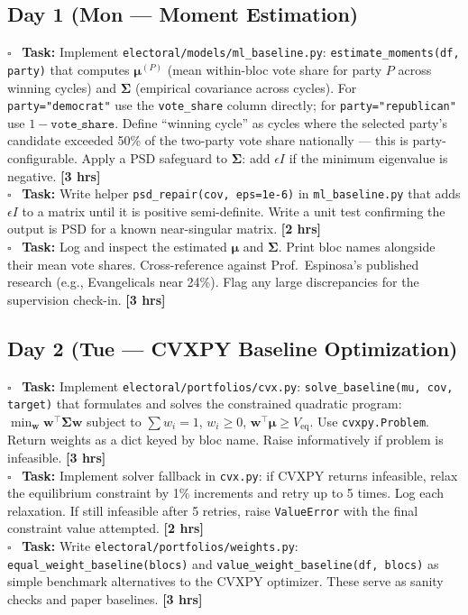 \documentclass[11pt]{article}
\newcommand{\hrs}[1]{\textbf{[#1 hrs]}}
\newcommand{\veq}{V_{\mathrm{eq}}}
\newcommand{\boldmu}{\boldsymbol{\mu}}
\newcommand{\boldSigma}{\boldsymbol{\Sigma}}
\newcommand{\dayhead}[2]{%
  \subsection*{Day #1 \normalfont\small\color{codegray}(#2)}}
\newcommand{\task}[2]{%
  \noindent\textbf{Task:} #1 \hfill \hrs{#2}\\}
\newcommand{\done}{\textcolor{sectionblue}{$\square$}\ }
\begin{document}
\dayhead{1}{Mon --- Moment Estimation}

\begin{taskbox}
\done \task{Implement \texttt{electoral/models/ml\_baseline.py}:
  \texttt{estimate\_moments(df, party)} that computes $\boldmu^{(P)}$ (mean
  within-bloc vote share for party $P$ across winning cycles) and $\boldSigma$
  (empirical covariance across cycles). For \texttt{party="democrat"} use the
  \texttt{vote\_share} column directly; for \texttt{party="republican"} use
  $1 - \texttt{vote\_share}$. Define ``winning cycle'' as cycles where the
  selected party's candidate exceeded 50\% of the two-party vote share
  nationally --- this is party-configurable. Apply a PSD safeguard to
  $\boldSigma$: add $\epsilon I$ if the minimum eigenvalue is negative.}{3}

\done \task{Write helper \texttt{psd\_repair(cov, eps=1e-6)} in
  \texttt{ml\_baseline.py} that adds $\epsilon I$ to a matrix until it is
  positive semi-definite. Write a unit test confirming the output is PSD
  for a known near-singular matrix.}{2}

\done \task{Log and inspect the estimated $\boldmu$ and $\boldSigma$. Print
  bloc names alongside their mean vote shares. Cross-reference against
  Prof.\ Espinosa's published research (e.g., Evangelicals near 24\%).
  Flag any large discrepancies for the supervision check-in.}{3}
\end{taskbox}

\dayhead{2}{Tue --- CVXPY Baseline Optimization}

\begin{taskbox}
\done \task{Implement \texttt{electoral/portfolios/cvx.py}: \texttt{solve\_baseline(mu,
  cov, target)} that formulates and solves the constrained quadratic program:
  $\min_{\mathbf{w}} \mathbf{w}^\top\boldSigma\mathbf{w}$ subject to
  $\sum w_i = 1$, $w_i \geq 0$, $\mathbf{w}^\top\boldmu \geq \veq$.
  Use \texttt{cvxpy.Problem}. Return weights as a dict keyed by bloc name.
  Raise informatively if problem is infeasible.}{3}

\done \task{Implement solver fallback in \texttt{cvx.py}: if CVXPY returns
  infeasible, relax the equilibrium constraint by 1\% increments and retry
  up to 5 times. Log each relaxation. If still infeasible after 5 retries,
  raise \texttt{ValueError} with the final constraint value attempted.}{2}

\done \task{Write \texttt{electoral/portfolios/weights.py}: \texttt{equal\_weight\_baseline(blocs)}
  and \texttt{value\_weight\_baseline(df, blocs)} as simple benchmark alternatives
  to the CVXPY optimizer. These serve as sanity checks and paper baselines.}{3}
\end{taskbox}
\end{document}
